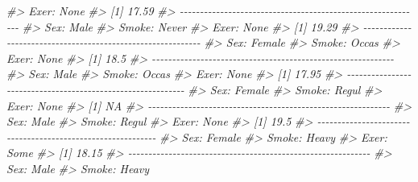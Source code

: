 \documentclass[
]{book}
\newenvironment{Shaded}{\begin{snugshade}}{\end{snugshade}}
\newcommand{\CommentTok}[1]{\textcolor[rgb]{0.56,0.35,0.01}{\textit{#1}}}
\begin{document}
\begin{Shaded}
\begin{Highlighting}[]
\CommentTok{\#\textgreater{} Exer: None}
\CommentTok{\#\textgreater{} [1] 17.59}
\CommentTok{\#\textgreater{} {-}{-}{-}{-}{-}{-}{-}{-}{-}{-}{-}{-}{-}{-}{-}{-}{-}{-}{-}{-}{-}{-}{-}{-}{-}{-}{-}{-}{-}{-}{-}{-}{-}{-}{-}{-}{-}{-}{-}{-}{-}{-}{-}{-}{-}{-}{-}{-}{-}{-}{-}{-}{-}{-}{-}{-}{-}{-}{-}{-} }
\CommentTok{\#\textgreater{} Sex: Male}
\CommentTok{\#\textgreater{} Smoke: Never}
\CommentTok{\#\textgreater{} Exer: None}
\CommentTok{\#\textgreater{} [1] 19.29}
\CommentTok{\#\textgreater{} {-}{-}{-}{-}{-}{-}{-}{-}{-}{-}{-}{-}{-}{-}{-}{-}{-}{-}{-}{-}{-}{-}{-}{-}{-}{-}{-}{-}{-}{-}{-}{-}{-}{-}{-}{-}{-}{-}{-}{-}{-}{-}{-}{-}{-}{-}{-}{-}{-}{-}{-}{-}{-}{-}{-}{-}{-}{-}{-}{-} }
\CommentTok{\#\textgreater{} Sex: Female}
\CommentTok{\#\textgreater{} Smoke: Occas}
\CommentTok{\#\textgreater{} Exer: None}
\CommentTok{\#\textgreater{} [1] 18.5}
\CommentTok{\#\textgreater{} {-}{-}{-}{-}{-}{-}{-}{-}{-}{-}{-}{-}{-}{-}{-}{-}{-}{-}{-}{-}{-}{-}{-}{-}{-}{-}{-}{-}{-}{-}{-}{-}{-}{-}{-}{-}{-}{-}{-}{-}{-}{-}{-}{-}{-}{-}{-}{-}{-}{-}{-}{-}{-}{-}{-}{-}{-}{-}{-}{-} }
\CommentTok{\#\textgreater{} Sex: Male}
\CommentTok{\#\textgreater{} Smoke: Occas}
\CommentTok{\#\textgreater{} Exer: None}
\CommentTok{\#\textgreater{} [1] 17.95}
\CommentTok{\#\textgreater{} {-}{-}{-}{-}{-}{-}{-}{-}{-}{-}{-}{-}{-}{-}{-}{-}{-}{-}{-}{-}{-}{-}{-}{-}{-}{-}{-}{-}{-}{-}{-}{-}{-}{-}{-}{-}{-}{-}{-}{-}{-}{-}{-}{-}{-}{-}{-}{-}{-}{-}{-}{-}{-}{-}{-}{-}{-}{-}{-}{-} }
\CommentTok{\#\textgreater{} Sex: Female}
\CommentTok{\#\textgreater{} Smoke: Regul}
\CommentTok{\#\textgreater{} Exer: None}
\CommentTok{\#\textgreater{} [1] NA}
\CommentTok{\#\textgreater{} {-}{-}{-}{-}{-}{-}{-}{-}{-}{-}{-}{-}{-}{-}{-}{-}{-}{-}{-}{-}{-}{-}{-}{-}{-}{-}{-}{-}{-}{-}{-}{-}{-}{-}{-}{-}{-}{-}{-}{-}{-}{-}{-}{-}{-}{-}{-}{-}{-}{-}{-}{-}{-}{-}{-}{-}{-}{-}{-}{-} }
\CommentTok{\#\textgreater{} Sex: Male}
\CommentTok{\#\textgreater{} Smoke: Regul}
\CommentTok{\#\textgreater{} Exer: None}
\CommentTok{\#\textgreater{} [1] 19.5}
\CommentTok{\#\textgreater{} {-}{-}{-}{-}{-}{-}{-}{-}{-}{-}{-}{-}{-}{-}{-}{-}{-}{-}{-}{-}{-}{-}{-}{-}{-}{-}{-}{-}{-}{-}{-}{-}{-}{-}{-}{-}{-}{-}{-}{-}{-}{-}{-}{-}{-}{-}{-}{-}{-}{-}{-}{-}{-}{-}{-}{-}{-}{-}{-}{-} }
\CommentTok{\#\textgreater{} Sex: Female}
\CommentTok{\#\textgreater{} Smoke: Heavy}
\CommentTok{\#\textgreater{} Exer: Some}
\CommentTok{\#\textgreater{} [1] 18.15}
\CommentTok{\#\textgreater{} {-}{-}{-}{-}{-}{-}{-}{-}{-}{-}{-}{-}{-}{-}{-}{-}{-}{-}{-}{-}{-}{-}{-}{-}{-}{-}{-}{-}{-}{-}{-}{-}{-}{-}{-}{-}{-}{-}{-}{-}{-}{-}{-}{-}{-}{-}{-}{-}{-}{-}{-}{-}{-}{-}{-}{-}{-}{-}{-}{-} }
\CommentTok{\#\textgreater{} Sex: Male}
\CommentTok{\#\textgreater{} Smoke: Heavy}

\end{Highlighting}
\end{Shaded}
\end{document}
